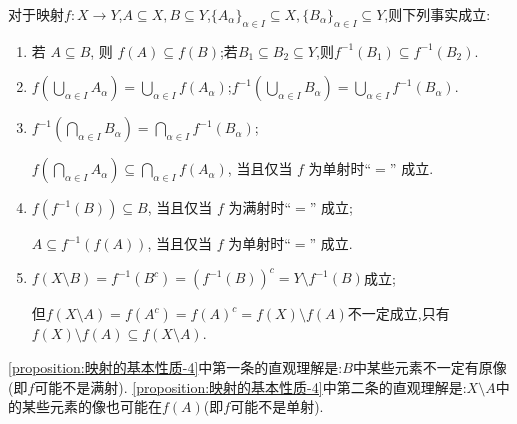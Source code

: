 \documentclass[../../main.tex]{subfiles}%
\begin{document}
\begin{proposition}[映射的基本性质]\label{proposition:映射的基本性质}
对于映射$f : X \to Y$,$A\subseteq X,B\subseteq Y$,$\{A_\alpha\}_{\alpha \in I}\subseteq X,\{B_\alpha\}_{\alpha \in I}\subseteq Y$,则下列事实成立:
\begin{enumerate}[(1)]
\item\label{proposition:映射的基本性质-1} 若 $A \subseteq B$, 则 $f(A) \subseteq f(B)$;若$B_1\subseteq B_2\subseteq Y$,则$f^{-1}(B_1)\subseteq f^{-1}(B_2).$

\item\label{proposition:映射的基本性质-2} $f\left(\bigcup_{\alpha \in I} A_{\alpha}\right) = \bigcup_{\alpha \in I} f(A_{\alpha})$;$f^{-1}\left(\bigcup_{\alpha \in I} B_{\alpha}\right) = \bigcup_{\alpha \in I} f^{-1}(B_{\alpha})$.

\item\label{proposition:映射的基本性质-3} $f^{-1}\left(\bigcap_{\alpha\in I}B_{\alpha}\right)=\bigcap_{\alpha\in I}f^{-1}(B_{\alpha})$;

$f\left(\bigcap_{\alpha \in I} A_{\alpha}\right) \subseteq \bigcap_{\alpha \in I} f(A_{\alpha})$, 当且仅当 $f$ 为单射时“$=$” 成立.

\item\label{proposition:映射的基本性质-4} $f\left(f^{-1}(B)\right) \subseteq B$, 当且仅当 $f$ 为满射时“$=$” 成立;

$A \subseteq f^{-1}(f(A))$, 当且仅当 $f$ 为单射时“$=$” 成立.

\item\label{proposition:映射的基本性质-5} $f\left( X\setminus B \right) =f^{-1}(B^c)=\left( f^{-1}(B) \right) ^c=Y\setminus f^{-1}(B)$成立;

但$f\left( X\setminus A \right) =f\left( A^c \right) =f\left( A \right) ^c=f\left( X \right) \setminus f\left( A \right)$不一定成立,只有$f(X)\setminus f(A)\subseteq f(X\setminus A).$
\end{enumerate}
\end{proposition}
\begin{note}
\ref{proposition:映射的基本性质-4}中第一条的直观理解是:$B$中某些元素不一定有原像(即$f$可能不是满射).
\ref{proposition:映射的基本性质-4}中第二条的直观理解是:$X\setminus A$中的某些元素的像也可能在$f(A)$(即$f$可能不是单射).
\end{note}
\end{document}

